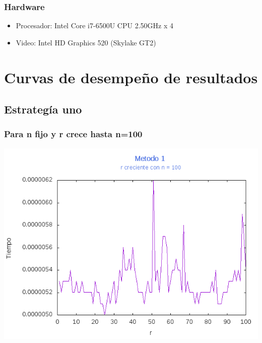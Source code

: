\documentclass[12pt,letterpaper]{scrartcl}
\begin{document}
\subsubsection{Hardware}
\begin{itemize}
\item Procesador: Intel Core i7-6500U CPU  2.50GHz x 4 
\item Video: Intel HD Graphics 520 (Skylake GT2) 
\end{itemize}


\newpage

\section{Curvas de desempeño de resultados}

\subsection{Estrategía uno}

\subsubsection{Para n fijo y r crece hasta n=100}
\includegraphics[scale=1]{Metodo1/plot100m1}
\end{document}
